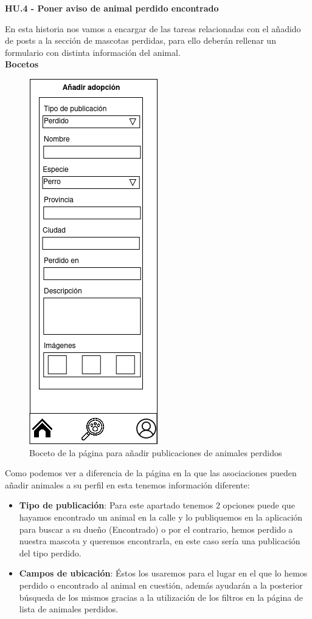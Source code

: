 \Large{\textbf{HU.4 - Poner aviso de animal perdido encontrado}}

En esta historia nos vamos a encargar de las tareas relacionadas con el añadido de posts a la sección de mascotas perdidas, para ello deberán rellenar un formulario con distinta información del animal. \\
\textbf{Bocetos}
\begin{figure}[H]
	\centering
	\includegraphics[width=0.31\linewidth]{"sprint 2/hu4/postearPerdido"}
	\caption{Boceto de la página para añadir publicaciones de animales perdidos}
	\label{fig:postearperdido}
\end{figure}

Como podemos ver a diferencia de la página en la que las asociaciones pueden añadir animales a su perfil en esta tenemos información diferente:

\begin{itemize}
	\item \textbf{Tipo de publicación}: Para este apartado tenemos 2 opciones puede que hayamos encontrado un animal en la calle y lo publiquemos en la aplicación para buscar a su dueño (Encontrado) o por el contrario, hemos perdido a nuestra mascota y queremos encontrarla, en este caso sería una publicación del tipo perdido. \\ 
	
	\item \textbf{Campos de ubicación}: Éstos los usaremos para el lugar en el que lo hemos perdido o encontrado al animal en cuestión, además ayudarán a la posterior búsqueda de los mismos gracias a la utilización de los filtros en la página de lista de animales perdidos. \\
	 
\end{itemize}

